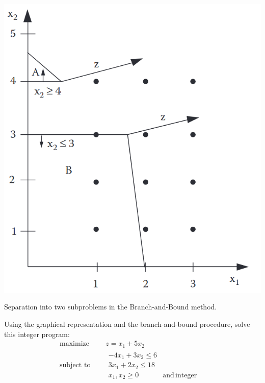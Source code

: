 \documentclass[c]{beamer}
\begin{document}
  \begin{frame}
    \begin{center}
      \includegraphics[width=0.4\linewidth]{../figures/BranchandBound.png}
    \end{center}
    Separation into two subproblems in the Branch-and-Bound method\cite{carter}.
  \end{frame}

\begin{frame}

  \begin{Exercise}
    Using the graphical representation and the branch-and-bound procedure, solve this integer program:
    \begin{equation*}
      \begin{aligned}
        \text{maximize } \quad & z=x_1+5x_2 \\
        \text{subject to }\quad &
        \begin{array}{rcl}
          -4x_1+3x_2\leq 6&&  \\
          3x_1+2x_2\leq 18&&  \\
          x_1,x_2 \geq 0 & \mathrm{and\,integer}
        \end{array}
      \end{aligned}
    \end{equation*}
  \end{Exercise}

\end{frame}



\end{document}
